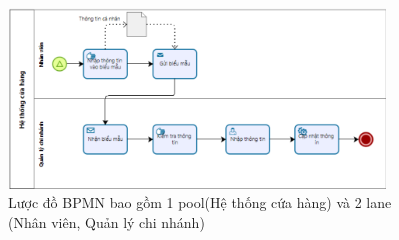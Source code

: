 \begin{figure}[!htp]
	\centering
	\includegraphics[width=10cm]{img/theory/BPMN/BPMN_swimlane.png}
	\newline
	\caption{Lược đồ BPMN bao gồm 1 pool(Hệ thống cứa hàng) và 2 lane (Nhân viên, Quản lý chi nhánh)}
\end{figure}

